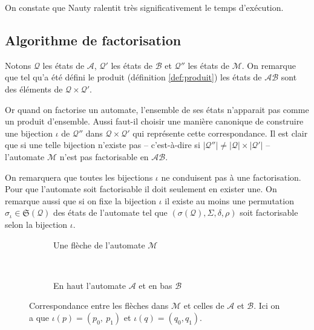 \documentclass[11pt,a4paper]{article}
\begin{document}
On constate que Nauty ralentit très significativement le temps d'exécution.

\subsection{Algorithme de factorisation\label{sec:facto}}

  Notons $\mathcal{Q}$ les états de $\mathcal{A}$, $\mathcal{Q'}$ les états de $\mathcal{B}$ et $\mathcal{Q''}$ les états de $\mathcal{M}$. On remarque que tel qu'a été défini le produit (définition \ref{def:produit}) les états de $\mathcal{AB}$ sont des éléments de $\mathcal{Q}\times\mathcal{Q'}$.

Or quand on factorise un automate, l'ensemble de ses états n'apparait pas comme un produit d'ensemble. Aussi faut-il choisir une manière canonique de construire une bijection $\iota$ de $\mathcal{Q''}$ dans $\mathcal{Q}\times\mathcal{Q'}$ qui représente cette correspondance. Il est clair que si une telle bijection n'existe pas -- c'est-à-dire si $|\mathcal{Q}''| \ne |\mathcal{Q}|\times|\mathcal{Q'}|$ -- l'automate $\mathcal{M}$ n'est pas factorisable en $\mathcal{AB}$.


On remarquera que toutes les bijections $\iota$ ne conduisent pas à une factorisation. Pour que l'automate soit factorisable il doit seulement en exister une. On remarque aussi que si on fixe la bijection $\iota$ il existe au moins une permutation $\sigma_\iota\in\mathfrak{S}(\mathcal{Q})$ des états de l'automate tel que $\left(\sigma(\mathcal{Q}), \Sigma, \delta, \rho\right)$ soit factorisable selon la bijection $\iota$.

\begin{figure}[h!]
  \begin{subfigure}[b]{0.5\textwidth}
    \centering
    \caption{Une flèche de l'automate $\mathcal{M}$}
  \end{subfigure}
  ~
  \begin{subfigure}[b]{0.5\textwidth}
    \centering
    \caption{En haut l'automate $\mathcal{A}$ et en bas $\mathcal{B}$\label{fig:factor-ab}}
  \end{subfigure}
  \caption{Correspondance entre les flèches dans $\mathcal{M}$ et celles de $\mathcal{A}$ et $\mathcal{B}$. Ici on a que $\iota(p) = (p_0,~p_1)$ et $\iota(q)=(q_0, q_1)$\label{fig:facto}.}
\end{figure}
\end{document}
